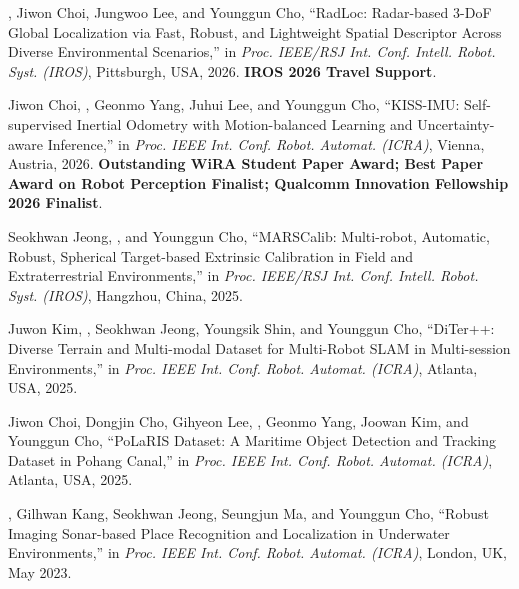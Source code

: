 \begin{pubSubsectionNum}
    \item \hogyunkim, Jiwon Choi, Jungwoo Lee, and Younggun Cho, ``RadLoc: Radar-based 3-DoF Global Localization via Fast, Robust, and Lightweight Spatial Descriptor Across Diverse Environmental Scenarios,'' in \textit{Proc. IEEE/RSJ Int. Conf. Intell. Robot. Syst. (IROS)}, Pittsburgh, USA, 2026. \textbf{IROS 2026 Travel Support}.
    \item Jiwon Choi, \hogyunkim, Geonmo Yang, Juhui Lee, and Younggun Cho, ``KISS-IMU: Self-supervised Inertial Odometry with Motion-balanced Learning and Uncertainty-aware Inference,'' in \textit{Proc. IEEE Int. Conf. Robot. Automat. (ICRA)}, Vienna, Austria, 2026. \textbf{Outstanding WiRA Student Paper Award; Best Paper Award on Robot Perception Finalist; Qualcomm Innovation Fellowship 2026 Finalist}.
    \item Seokhwan Jeong, \hogyunkim, and Younggun Cho, ``MARSCalib: Multi-robot, Automatic, Robust, Spherical Target-based Extrinsic Calibration in Field and Extraterrestrial Environments,'' in \textit{Proc. IEEE/RSJ Int. Conf. Intell. Robot. Syst. (IROS)}, Hangzhou, China, 2025.
    \item Juwon Kim, \hogyunkim, Seokhwan Jeong, Youngsik Shin, and Younggun Cho, ``DiTer++: Diverse Terrain and Multi-modal Dataset for Multi-Robot SLAM in Multi-session Environments,'' in \textit{Proc. IEEE Int. Conf. Robot. Automat. (ICRA)}, Atlanta, USA, 2025.
    \item Jiwon Choi, Dongjin Cho, Gihyeon Lee, \hogyunkim, Geonmo Yang, Joowan Kim, and Younggun Cho, ``PoLaRIS Dataset: A Maritime Object Detection and Tracking Dataset in Pohang Canal,'' in \textit{Proc. IEEE Int. Conf. Robot. Automat. (ICRA)}, Atlanta, USA, 2025.
    \item \hogyunkim, Gilhwan Kang, Seokhwan Jeong, Seungjun Ma, and Younggun Cho, ``Robust Imaging Sonar-based Place Recognition and Localization in Underwater Environments,'' in \textit{Proc. IEEE Int. Conf. Robot. Automat. (ICRA)}, London, UK, May 2023.
\end{pubSubsectionNum}
